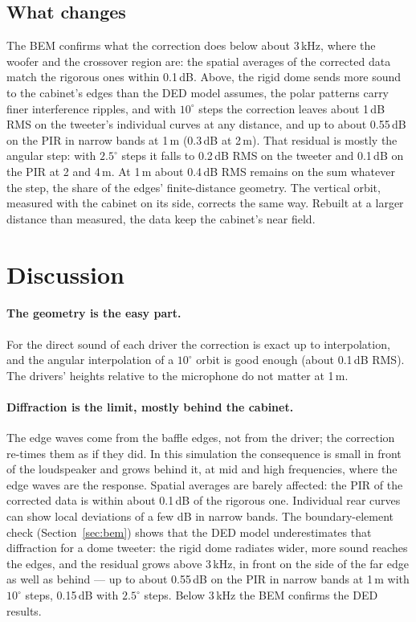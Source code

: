 \documentclass[11pt,a4paper]{article}
\begin{document}
\subsection{What changes}

The BEM confirms what the correction does below about 3\,kHz, where the woofer and the crossover region
are: the spatial averages of the corrected data match the rigorous ones within 0.1\,dB. Above, the rigid
dome sends more sound to the cabinet's edges than the DED model assumes, the polar patterns carry finer
interference ripples, and with $10^\circ$ steps the correction leaves about 1\,dB RMS on the tweeter's
individual curves at any distance, and up to about 0.55\,dB on the PIR in narrow bands at 1\,m (0.3\,dB at
2\,m). That residual is mostly the angular step: with $2.5^\circ$ steps it falls to 0.2\,dB RMS on the
tweeter and 0.1\,dB on the PIR at 2 and 4\,m. At 1\,m about 0.4\,dB RMS remains on the sum whatever the
step, the share of the edges' finite-distance geometry. The vertical orbit, measured with the cabinet on its
side, corrects the same way. Rebuilt at a larger distance than measured, the data keep the cabinet's near
field.

\section{Discussion}

\paragraph{The geometry is the easy part.} For the direct sound of each driver the correction is
exact up to interpolation, and the angular interpolation of a $10^\circ$ orbit is good enough
(about 0.1\,dB RMS). The drivers' heights relative to the microphone do not matter at 1\,m.

\paragraph{Diffraction is the limit, mostly behind the cabinet.} The edge waves come from the baffle
edges, not from the driver; the correction re-times them as if they did. In this simulation the
consequence is small in front of the loudspeaker and grows behind it, at mid and high frequencies,
where the edge waves are the response. Spatial averages are barely affected: the PIR of the corrected
data is within about 0.1\,dB of the rigorous one. Individual rear curves can show local deviations of a
few dB in narrow bands. The boundary-element check (Section~\ref{sec:bem}) shows that the DED model
underestimates that diffraction for a dome tweeter: the rigid dome radiates wider, more sound reaches the
edges, and the residual grows above 3\,kHz, in front on the side of the far edge as well as behind --- up to
about 0.55\,dB on the PIR in narrow bands at 1\,m with $10^\circ$ steps, 0.15\,dB with $2.5^\circ$ steps. Below
3\,kHz the BEM confirms the DED results.
\end{document}
